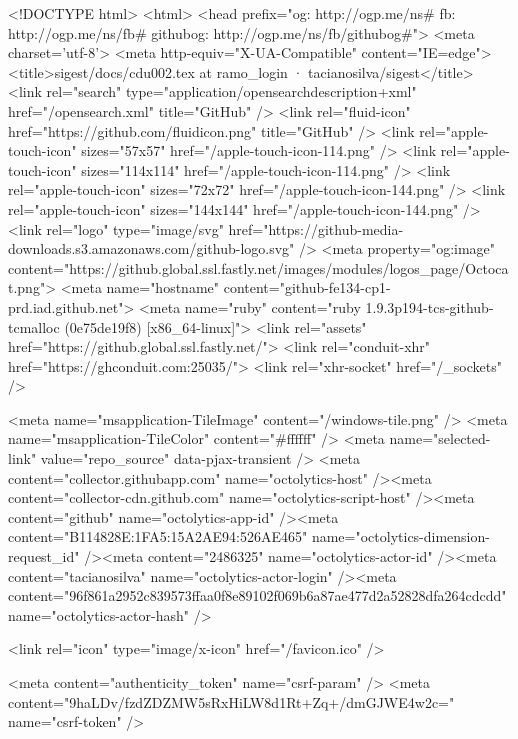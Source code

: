 


<!DOCTYPE html>
<html>
  <head prefix="og: http://ogp.me/ns# fb: http://ogp.me/ns/fb# githubog: http://ogp.me/ns/fb/githubog#">
    <meta charset='utf-8'>
    <meta http-equiv="X-UA-Compatible" content="IE=edge">
        <title>sigest/docs/cdu002.tex at ramo_login · tacianosilva/sigest</title>
    <link rel="search" type="application/opensearchdescription+xml" href="/opensearch.xml" title="GitHub" />
    <link rel="fluid-icon" href="https://github.com/fluidicon.png" title="GitHub" />
    <link rel="apple-touch-icon" sizes="57x57" href="/apple-touch-icon-114.png" />
    <link rel="apple-touch-icon" sizes="114x114" href="/apple-touch-icon-114.png" />
    <link rel="apple-touch-icon" sizes="72x72" href="/apple-touch-icon-144.png" />
    <link rel="apple-touch-icon" sizes="144x144" href="/apple-touch-icon-144.png" />
    <link rel="logo" type="image/svg" href="https://github-media-downloads.s3.amazonaws.com/github-logo.svg" />
    <meta property="og:image" content="https://github.global.ssl.fastly.net/images/modules/logos_page/Octocat.png">
    <meta name="hostname" content="github-fe134-cp1-prd.iad.github.net">
    <meta name="ruby" content="ruby 1.9.3p194-tcs-github-tcmalloc (0e75de19f8) [x86_64-linux]">
    <link rel="assets" href="https://github.global.ssl.fastly.net/">
    <link rel="conduit-xhr" href="https://ghconduit.com:25035/">
    <link rel="xhr-socket" href="/_sockets" />
    


    <meta name="msapplication-TileImage" content="/windows-tile.png" />
    <meta name="msapplication-TileColor" content="#ffffff" />
    <meta name="selected-link" value="repo_source" data-pjax-transient />
    <meta content="collector.githubapp.com" name="octolytics-host" /><meta content="collector-cdn.github.com" name="octolytics-script-host" /><meta content="github" name="octolytics-app-id" /><meta content="B114828E:1FA5:15A2AE94:526AE465" name="octolytics-dimension-request_id" /><meta content="2486325" name="octolytics-actor-id" /><meta content="tacianosilva" name="octolytics-actor-login" /><meta content="96f861a2952c839573ffaa0f8e89102f069b6a87ae477d2a52828dfa264cdcdd" name="octolytics-actor-hash" />
    

    
    
    <link rel="icon" type="image/x-icon" href="/favicon.ico" />

    <meta content="authenticity_token" name="csrf-param" />
<meta content="9haLDv/fzdZDZMW5sRxHiLW8d1Rt+Zq+/dmGJWE4w2c=" name="csrf-token" />

